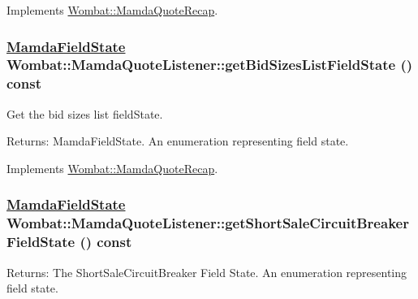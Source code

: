 Implements \hyperlink{classWombat_1_1MamdaQuoteRecap_c159beb494cd9e208bf472bd4af0c194}{Wombat::Mamda\-Quote\-Recap}.\hypertarget{classWombat_1_1MamdaQuoteListener_1b8e1f6e95a20180b0f69df8fb9fdced}{
\subsubsection[getBidSizesListFieldState]{\setlength{\rightskip}{0pt plus 5cm}\hyperlink{namespaceWombat_93aac974f2ab713554fd12a1fa3b7d2a}{Mamda\-Field\-State} Wombat::Mamda\-Quote\-Listener::get\-Bid\-Sizes\-List\-Field\-State () const}}
\label{classWombat_1_1MamdaQuoteListener_1b8e1f6e95a20180b0f69df8fb9fdced}


Get the bid sizes list field\-State. 

\begin{Desc}
\item[Returns:]Mamda\-Field\-State. An enumeration representing field state. \end{Desc}


Implements \hyperlink{classWombat_1_1MamdaQuoteRecap_8f599613010d229d59ab812227aa3373}{Wombat::Mamda\-Quote\-Recap}.\hypertarget{classWombat_1_1MamdaQuoteListener_741a0cdce0ceb5247ec54a883b265374}{
\subsubsection[getShortSaleCircuitBreakerFieldState]{\setlength{\rightskip}{0pt plus 5cm}\hyperlink{namespaceWombat_93aac974f2ab713554fd12a1fa3b7d2a}{Mamda\-Field\-State} Wombat::Mamda\-Quote\-Listener::get\-Short\-Sale\-Circuit\-Breaker\-Field\-State () const}}
\label{classWombat_1_1MamdaQuoteListener_741a0cdce0ceb5247ec54a883b265374}


\begin{Desc}
\item[Returns:]The Short\-Sale\-Circuit\-Breaker Field State. An enumeration representing field state. \end{Desc}


